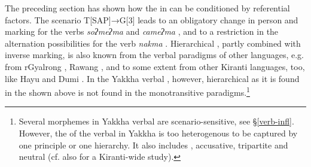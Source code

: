 The preceding section has shown how the  in  can be conditioned by referential factors. The scenario  T[SAP]→G[3]  leads to an obligatory change in  person and  marking for the verbs \emph{soʔmeʔma}  and \emph{cameʔma} , and to a restriction in the alternation possibilities for the verb \emph{nakma} . Hierarchical , partly combined with inverse marking, is also known from the verbal paradigms of other  languages, e.g. from rGyalrong \citep{Nagano1984A-historical}, Rawang \citep{LaPolla2007Hierarchical}, and to some extent from other Kiranti languages, too, like Hayu and Dumi \citep{Michailovsky2003Hayu, Driem1993A-grammar}. In the Yakkha verbal , however, hierarchical  as it is found in the  shown above is not found in the monotransitive paradigms.\footnote{Several morphemes in Yakkha verbal  are scenario-sensitive, see §\ref{verb-infl}. However, the  of the verbal  in Yakkha is too heterogenous to be captured by one principle or one hierarchy. It also includes , accusative, tripartite and neutral  (cf. also \citet{Witzlacketal2011_Decomposing} for a Kiranti-wide study).}


 